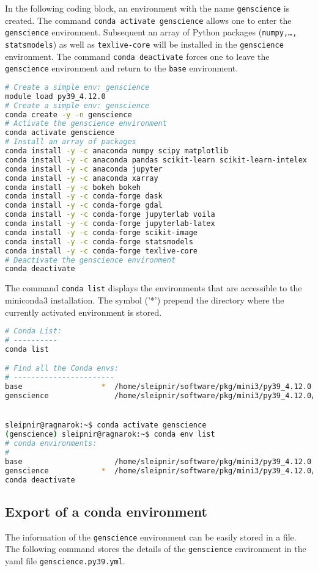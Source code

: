 \documentclass[10pt]{article}
\begin{document}
In the following coding block, an environment with the name \texttt{genscience} is created. The command \texttt{conda activate genscience} allows
one to enter the \texttt{genscience} environment. Subsequent an array of Python packages (\texttt{numpy,\ldots, statsmodels}) as well as 
\texttt{texlive-core} will be installed in the \texttt{genscience} environment.
The command \lstinline[language=bash]{conda deactivate} forces one to leave the \texttt{genscience} environment and return to the \texttt{base}
environment.

\begin{lstlisting}[language=bash]
# Create a simple env: genscience
module load py39_4.12.0
# Create a simple env: genscience
conda create -y -n genscience 
# Activate the genscience environment
conda activate genscience
# Install an array of packages
conda install -y -c anaconda numpy scipy matplotlib 
conda install -y -c anaconda pandas scikit-learn scikit-learn-intelex
conda install -y -c anaconda jupyter
conda install -y -c anaconda xarray
conda install -y -c bokeh bokeh
conda install -y -c conda-forge dask
conda install -y -c conda-forge gdal
conda install -y -c conda-forge jupyterlab voila
conda install -y -c conda-forge jupyterlab-latex
conda install -y -c conda-forge scikit-image
conda install -y -c conda-forge statsmodels
conda install -y -c conda-forge texlive-core
# Deactivate the genscience environment
conda deactivate
\end{lstlisting}

The command \texttt{conda list} displays the environments that are accessible to the miniconda3 installation.
The symbol ('*') prepend the directory where the currently activated environment is stored.


\begin{lstlisting}[language=bash]
# Conda List:
# ----------
conda list

# Find all the Conda envs:
# -----------------------
base                  *  /home/sleipnir/software/pkg/mini3/py39_4.12.0
genscience               /home/sleipnir/software/pkg/mini3/py39_4.12.0/envs/genscience


sleipnir@ragnarok:~$ conda activate genscience
(genscience) sleipnir@ragnarok:~$ conda env list
# conda environments:
#
base                     /home/sleipnir/software/pkg/mini3/py39_4.12.0
genscience            *  /home/sleipnir/software/pkg/mini3/py39_4.12.0/envs/genscience
conda deactivate
\end{lstlisting}

\subsection{Export of a conda environment}
The information of the \texttt{genscience} environment can be easily stored in a file.
The following command stores the details of the \texttt{genscience} environment in the 
yaml file \texttt{genscience.py39.yml}.
\end{document}
